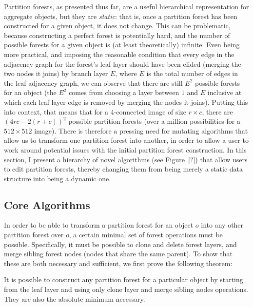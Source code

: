 Partition forests, as presented thus far, are a useful hierarchical representation for aggregate objects, but they are \emph{static}: that is, once a partition forest has been constructed for a given object, it does not change. This can be problematic, because constructing a perfect forest is potentially hard, and the number of possible forests for a given object is (at least theoretically) infinite. Even being more practical, and imposing the reasonable condition that every edge in the adjacency graph for the forest's leaf layer should have been elided (merging the two nodes it joins) by branch layer $E$, where $E$ is the total number of edges in the leaf adjacency graph, we can observe that there are still $E^2$ possible forests for an object (the $E^2$ comes from choosing a layer between $1$ and $E$ inclusive at which each leaf layer edge is removed by merging the nodes it joins). Putting this into context, that means that for a $4$-connected image of size $r \times c$, there are $(4rc - 2(r+c))^2$ possible partition forests (over a million possibilities for a $512 \times 512$ image). There is therefore a pressing need for mutating algorithms that allow us to transform one partition forest into another, in order to allow a user to work around potential issues with the initial partition forest construction. In this section, I present a hierarchy of novel algorithms (see Figure~\ref{?}) that allow users to edit partition forests, thereby changing them from being merely a static data structure into being a dynamic one.

\subsection{Core Algorithms}

In order to be able to transform a partition forest for an object $o$ into any other partition forest over $o$, a certain minimal set of forest operations must be possible. Specifically, it must be possible to clone and delete forest layers, and merge sibling forest nodes (nodes that share the same parent). To show that these are both necessary and sufficient, we first prove the following theorem:

\begin{theorem}
\label{thrm:ipfs-construction}
It is possible to construct any partition forest for a particular object by starting from the leaf layer and using only clone layer and merge sibling nodes operations. They are also the absolute minimum necessary.
\end{theorem}

